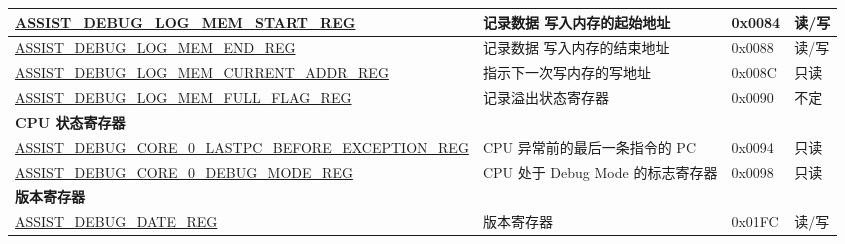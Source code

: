 \begin{longtable}{ | l| m{3.2cm} | l | l | }
\hyperref[regdesc:ASSISTDEBUGLOGMEMSTARTREG]{ASSIST\_DEBUG\_LOG\_MEM\_START\_REG} & 记录数据 写入内存的起始地址 & 0x0084 & 读/写 \\ \hline
\hyperref[regdesc:ASSISTDEBUGLOGMEMENDREG]{ASSIST\_DEBUG\_LOG\_MEM\_END\_REG} & 记录数据 写入内存的结束地址 & 0x0088 & 读/写 \\ \hline
\hyperref[regdesc:ASSISTDEBUGLOGMEMCURRENTADDRREG]{ASSIST\_DEBUG\_LOG\_MEM\_CURRENT\_ADDR\_REG} & 指示下一次写内存的写地址 & 0x008C & 只读 \\ \hline
\hyperref[regdesc:ASSISTDEBUGLOGMEMFULLFLAGREG]{ASSIST\_DEBUG\_LOG\_MEM\_FULL\_FLAG\_REG} & 记录溢出状态寄存器 & 0x0090 & 不定 \\ \hline
\multicolumn{4}{|l|}{\textbf{CPU 状态寄存器}} \\ \hline
\hyperref[regdesc:ASSISTDEBUGCORE0LASTPCBEFOREEXCEPTIONREG]{ASSIST\_DEBUG\_CORE\_0\_LASTPC\_BEFORE\_EXCEPTION\_REG} & CPU 异常前的最后一条指令的 PC  & 0x0094 & 只读 \\ \hline
\hyperref[regdesc:ASSISTDEBUGCORE0DEBUGMODEREG]{ASSIST\_DEBUG\_CORE\_0\_DEBUG\_MODE\_REG} & CPU 处于 Debug Mode 的标志寄存器 & 0x0098 & 只读 \\ \hline
\multicolumn{4}{|l|}{\textbf{版本寄存器}} \\ \hline
\hyperref[regdesc:ASSISTDEBUGDATEREG]{ASSIST\_DEBUG\_DATE\_REG} & 版本寄存器 & 0x01FC & 读/写 \\ \hline
\end{longtable}
